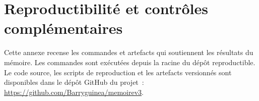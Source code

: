 \chapter{Reproductibilité et contrôles complémentaires}
\label{annexe:validation}
%
\setcounter{secnumdepth}{2}
\makeatletter
\renewcommand\origsubsubsection{\@startsection{subsubsection}{3}{\z@}%
                                     {12bp\@plus .2ex \@minus .2ex}%
                                     {.01pt \@plus .2ex}%
                                     {\normalfont\normalsize\itshape\baselineskip=\simpleinter}}
\makeatother

Cette annexe recense les commandes et artefacts qui soutiennent les résultats du mémoire.
Les commandes sont exécutées depuis la racine du dépôt reproductible.
Le code source, les scripts de reproduction et les artefacts versionnés sont disponibles dans
le dépôt GitHub du projet~: \url{https://github.com/Barryguinea/memoirev3}.

